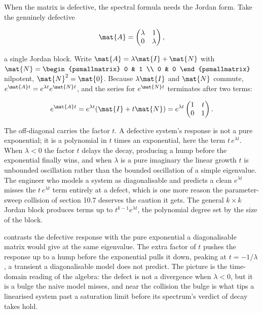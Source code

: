 When the matrix is defective, the spectral formula needs the Jordan
form. Take the genuinely defective

\[
\mat{A} = \begin{pmatrix} \lambda & 1 \\ 0 & \lambda \end{pmatrix},
\]

a single Jordan block. Write $\mat{A} = \lambda\mat{I} + \mat{N}$ with
$\mat{N} = \begin{psmallmatrix} 0 & 1 \\ 0 & 0 \end{psmallmatrix}$
nilpotent, $\mat{N}^{2} = \mat{0}$. Because $\lambda\mat{I}$ and
$\mat{N}$ commute, $e^{\mat{A}t} = e^{\lambda t}e^{\mat{N}t}$, and the
series for $e^{\mat{N}t}$ terminates after two terms:

\[
e^{\mat{A}t} = e^{\lambda t}(\mat{I} + t\mat{N}) = e^{\lambda t}
\begin{pmatrix} 1 & t \\ 0 & 1 \end{pmatrix}.
\]

The off-diagonal carries the factor $t$. A defective system's response
is not a pure exponential; it is a polynomial in $t$ times an
exponential, here the term $t\,e^{\lambda t}$. When $\lambda < 0$ the
factor $t$ delays the decay, producing a hump before the exponential
finally wins, and when $\lambda$ is a pure imaginary the linear growth
$t$ is unbounded oscillation rather than the bounded oscillation of a
simple eigenvalue. The engineer who models a system as diagonalisable
and predicts a clean $e^{\lambda t}$ misses the $t\,e^{\lambda t}$ term
entirely at a defect, which is one more reason the parameter-sweep
collision of section 10.7 deserves the caution it gets. The general
$k \times k$ Jordan block produces terms up to $t^{k-1}e^{\lambda t}$,
the polynomial degree set by the size of the block.



 contrasts the defective response
with the pure exponential a diagonalisable matrix would give at the
same eigenvalue. The extra factor of $t$ pushes the response up to a
hump before the exponential pulls it down, peaking at $t = -1/\lambda$,
a transient a diagonalisable model does not predict. The picture is the
time-domain reading of the algebra: the defect is not a divergence when
$\lambda < 0$, but it is a bulge the naive model misses, and near the
collision the bulge is what tips a linearised system past a saturation
limit before its spectrum's verdict of decay takes hold.


